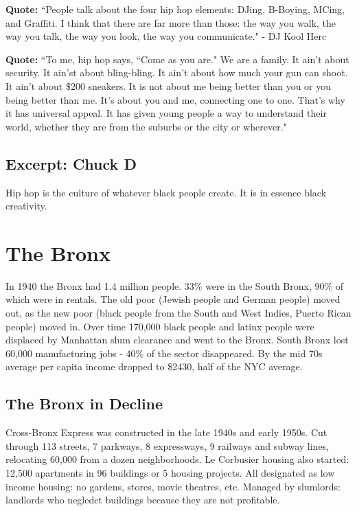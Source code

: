 \documentclass[12pt, a4paper, twoside, openright, titlepage]{book}
\begin{document}
\textbf{Quote:} ``People talk about the four hip hop elements: DJing, B-Boying, MCing, and Graffiti. I think that there are far more than those: the way you walk, the way you talk, the way you look, the way you communicate." - DJ Kool Herc


\textbf{Quote:} ``To me, hip hop says, ``Come as you are." We are a family. It ain't about security. It ain'st about bling-bling. It ain't about how much your gun can shoot. It ain't about \$200 sneakers. It is not about me being better than you or you being better than me. It's about you and me, connecting one to one. That's why it has universal appeal. It has given young people a way to understand their world, whether they are from the suburbs or the city or wherever."

\subsection{Excerpt: Chuck D}

Hip hop is the culture of whatever black people create. It is in essence black creativity.

\section{The Bronx}

In 1940 the Bronx had 1.4 million people. 33\% were in the South Bronx, 90\% of which were in rentals. The old poor (Jewish people and German people) moved out, as the new poor (black people from the South and West Indies, Puerto Rican people) moved in. Over time 170,000 black people and latinx people were displaced by Manhattan slum clearance and went to the Bronx. South Bronx lost 60,000 manufacturing jobs - 40\% of the sector disappeared. By the mid 70s average per capita income dropped to \$2430, half of the NYC average.

\subsection{The Bronx in Decline}

Cross-Bronx Express was constructed in the late 1940s and early 1950s. Cut through 113 streets, 7 parkways, 8 expressways, 9 railways and subway lines, relocating 60,000 from a dozen neighborhoods. Le Corbusier housing also started: 12,500 apartments in 96 buildings or 5 housing projects. All designated as low income housing: no gardens, stores, movie theatres, etc. Managed by slumlords: landlords who negledct buildings because they are not profitable.
\end{document}

